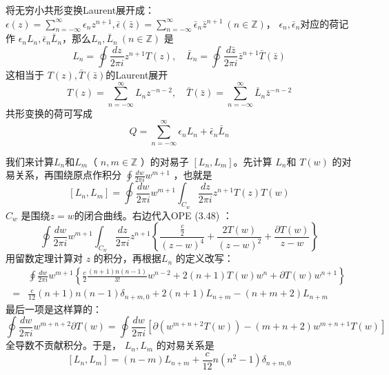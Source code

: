 将无穷小共形变换Laurent展开成：$\epsilon(z)=\sum_{n=-\infty}^{\infty} \epsilon_{n} z^{n+1}, \bar{\epsilon}(\bar{z})=\sum_{n=-\infty}^{\infty} \bar{\epsilon}_{n} \bar{z}^{n+1}\ (n\in \mathbb{Z}) $， $\epsilon_n,\bar{\epsilon}_n $对应的荷记作 $\epsilon_nL_n,\bar{\epsilon}_n\bar{L}_n $，那么$ L_n,\bar{L}_n\ (n\in \mathbb{Z})$ 是
\begin{equation}
	L_{n}=\oint \frac{d z}{2 \pi i} z^{n+1} T(z), \quad \bar{L}_{n}=\oint \frac{d \bar{z}}{2 \pi i} \bar{z}^{n+1} \bar{T}(\bar{z})
\end{equation}
这相当于 $T(z),\bar{T}(\bar{z}) $的Laurent展开
\begin{equation}
	T(z)=\sum_{n=-\infty}^{\infty} L_{n} z^{-n-2}, \quad \bar{T}(\bar{z})=\sum_{n=-\infty}^{\infty} \bar{L}_{n} \bar{z}^{-n-2}
\end{equation}
共形变换的荷可写成
\begin{equation}
	Q=\sum_{n=-\infty}^{\infty} \epsilon_{n} L_{n}+\bar{\epsilon}_{n} \bar{L}_{n}
\end{equation}

我们来计算$ L_n 和 L_m $（ $n,m\in \mathbb{Z}$ ）的对易子 $[L_n,L_m] $。先计算 $L_n $和 $T(w)$ 的对易关系，再围绕原点作积分 $\oint \frac{d w}{2 \pi i} w^{m+1}$ ，也就是
\begin{equation}
	\left[L_{n}, L_{m}\right]=\oint \frac{d w}{2 \pi i} w^{m+1} \int_{C_{w}} \frac{d z}{2 \pi i} z^{n+1} T(z) T(w)
\end{equation}
$C_w$ 是围绕$ z=w $的闭合曲线。右边代入OPE (3.48) ：
\[
	\oint \frac{d w}{2 \pi i} w^{m+1} \int_{C_{w}} \frac{d z}{2 \pi i} z^{n+1}\left\{\frac{\frac{c}{2}}{(z-w)^{4}}+\frac{2 T(w)}{(z-w)^{2}}+\frac{\partial T(w)}{z-w}\right\}
\]
用留数定理计算对 $z$ 的积分，再根据$ L_n$ 的定义改写：
\begin{equation}
	\begin{aligned} &\oint \frac{d w}{2 \pi i} w^{m+1}\left\{\frac{c}{2} \frac{(n+1) n(n-1)}{3 !} w^{n-2}+2(n+1) T(w) w^{n}+\partial T(w) w^{n+1}\right\} \\ =&\frac{c}{12}(n+1) n(n-1) \delta_{n+m, 0}+2(n+1) L_{n+m}-(n+m+2) L_{n+m} \end{aligned}
\end{equation}
最后一项是这样算的：
\[
\oint \frac{d w}{2 \pi i} w^{m+n+2} \partial T(w)=\oint \frac{d w}{2 \pi i} \left[\partial\left(w^{m+n+2} T(w)\right)-(m+n+2) w^{m+n+1} T(w)\right]
\]
全导数不贡献积分。于是， $L_n,L_m$ 的对易关系是
\begin{equation}
	\left[L_{n}, L_{m}\right]=(n-m) L_{n+m}+\frac{c}{12} n\left(n^{2}-1\right) \delta_{n+m, 0}
\end{equation}

